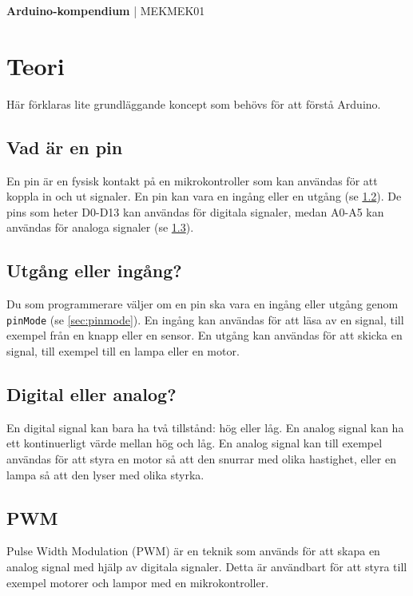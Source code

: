 \documentclass[11pt]{article}
\begin{document}
\raggedright{}
\begin{center}
      \textbf{\huge{Arduino-kompendium}}
      \huge{| MEKMEK01}
\end{center}
\vspace{2em}

\thispagestyle{empty}
\tableofcontents\label{toc}

\newpage

\section{Teori}
Här förklaras lite grundläggande koncept som behövs för att förstå Arduino.

\subsection{Vad är en pin}\label{sec:pin}
En pin är en fysisk kontakt på en mikrokontroller som kan användas för att
koppla in och ut signaler. En pin kan vara en ingång eller en utgång (se
\ref{sec:io}). De pins som heter D0-D13 kan användas för digitala signaler,
medan A0-A5 kan användas för analoga signaler (se \ref{sec:analog-digital}).

\subsection{Utgång eller ingång?}\label{sec:io}
Du som programmerare väljer om en pin ska vara en ingång eller utgång genom
\texttt{pinMode} (se \ref{sec:pinmode}). En ingång kan användas för att läsa av
en signal, till exempel från en knapp eller en sensor. En utgång kan användas
för att skicka en signal, till exempel till en lampa eller en motor.

\subsection{Digital eller analog?}\label{sec:analog-digital}
En digital signal kan bara ha två tillstånd: hög eller låg. En analog signal
kan ha ett kontinuerligt värde mellan hög och låg. En analog signal kan till
exempel användas för att styra en motor så att den snurrar med olika hastighet,
eller en lampa så att den lyser med olika styrka.

\subsection{PWM}\label{sec:pwm}
Pulse Width Modulation (PWM) är en teknik som används för att skapa en analog signal
med hjälp av digitala signaler. Detta är användbart för att styra till exempel
motorer och lampor med en mikrokontroller.
\end{document}
